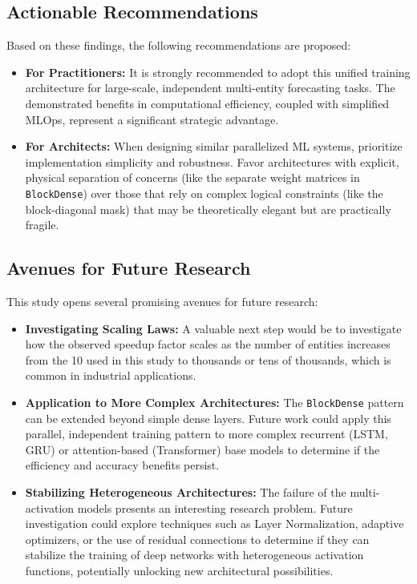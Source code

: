\documentclass{article}
\begin{document}
\subsection{Actionable Recommendations}
Based on these findings, the following recommendations are proposed:
\begin{itemize}
    \item \textbf{For Practitioners:} It is strongly recommended to adopt this unified training architecture for large-scale, independent multi-entity forecasting tasks. The demonstrated benefits in computational efficiency, coupled with simplified MLOps, represent a significant strategic advantage.
    \item \textbf{For Architects:} When designing similar parallelized ML systems, prioritize implementation simplicity and robustness. Favor architectures with explicit, physical separation of concerns (like the separate weight matrices in \texttt{BlockDense}) over those that rely on complex logical constraints (like the block-diagonal mask) that may be theoretically elegant but are practically fragile.
\end{itemize}

\subsection{Avenues for Future Research}
This study opens several promising avenues for future research:
\begin{itemize}
    \item \textbf{Investigating Scaling Laws:} A valuable next step would be to investigate how the observed speedup factor scales as the number of entities increases from the 10 used in this study to thousands or tens of thousands, which is common in industrial applications.
    \item \textbf{Application to More Complex Architectures:} The \texttt{BlockDense} pattern can be extended beyond simple dense layers. Future work could apply this parallel, independent training pattern to more complex recurrent (LSTM, GRU) or attention-based (Transformer) base models to determine if the efficiency and accuracy benefits persist.
    \item \textbf{Stabilizing Heterogeneous Architectures:} The failure of the multi-activation models presents an interesting research problem. Future investigation could explore techniques such as Layer Normalization, adaptive optimizers, or the use of residual connections to determine if they can stabilize the training of deep networks with heterogeneous activation functions, potentially unlocking new architectural possibilities.
\end{itemize}
\end{document}
